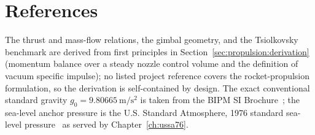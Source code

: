 \section{References}
\label{sec:propulsion:references}

The thrust and mass-flow relations, the gimbal geometry, and the
Tsiolkovsky benchmark are derived from first principles in
Section~\ref{sec:propulsion:derivation} (momentum balance over a
steady nozzle control volume and the definition of vacuum specific
impulse); no listed project reference covers the rocket-propulsion
formulation, so the derivation is self-contained by design. The exact
conventional standard gravity $g_0 = \qty{9.80665}{\metre\per\second
\squared}$ is taken from the BIPM SI Brochure~\cite{bipm2019}; the
sea-level anchor pressure is the U.S. Standard Atmosphere, 1976
standard sea-level pressure~\cite{ussa1976} as served by
Chapter~\ref{ch:ussa76}.
